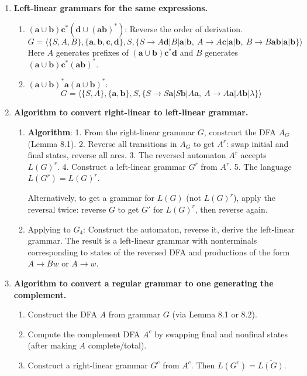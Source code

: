 \begin{enumerate}[{8.}1. ]
\item \textbf{Left-linear grammars for the same expressions.}

\begin{enumerate}
\item $(\pmb{a}\cup\pmb{b})\pmb{c}^*(\pmb{d}\cup(\pmb{ab})^*)$: Reverse the order of derivation.
\[
G = \langle\{S,A,B\},\{\pmb{a},\pmb{b},\pmb{c},\pmb{d}\},S,
\{S\to A\pmb{d}|B|\pmb{a}|\pmb{b},\ A\to A\pmb{c}|\pmb{a}|\pmb{b},\ B\to B\pmb{ab}|\pmb{a}|\pmb{b}\}\rangle
\]
Here $A$ generates prefixes of $(\pmb{a}\cup\pmb{b})\pmb{c}^*\pmb{d}$ and $B$ generates $(\pmb{a}\cup\pmb{b})\pmb{c}^*(\pmb{ab})^*$.

\item $(\pmb{a}\cup\pmb{b})^*\pmb{a}(\pmb{a}\cup\pmb{b})^*$:
\[
G = \langle\{S,A\},\{\pmb{a},\pmb{b}\},S,\{S\to S\pmb{a}|S\pmb{b}|A\pmb{a},\ A\to A\pmb{a}|A\pmb{b}|\lambda\}\rangle
\]
\end{enumerate}

\item \textbf{Algorithm to convert right-linear to left-linear grammar.}

\begin{enumerate}
\item \textbf{Algorithm}:
  1. From the right-linear grammar $G$, construct the DFA $A_G$ (Lemma 8.1).
  2. Reverse all transitions in $A_G$ to get $A^r$: swap initial and final states, reverse all arcs.
  3. The reversed automaton $A^r$ accepts $L(G)^r$.
  4. Construct a left-linear grammar $G^r$ from $A^r$.
  5. The language $L(G^r) = L(G)^r$.

  Alternatively, to get a grammar for $L(G)$ (not $L(G)^r$), apply the reversal twice: reverse $G$ to get $G'$ for $L(G)^r$, then reverse again.

\item Applying to $G_4$: Construct the automaton, reverse it, derive the left-linear grammar. The result is a left-linear grammar with nonterminals corresponding to states of the reversed DFA and productions of the form $A \to Bw$ or $A \to w$.
\end{enumerate}

\item \textbf{Algorithm to convert a regular grammar to one generating the complement.}

\begin{enumerate}
\item Construct the DFA $A$ from grammar $G$ (via Lemma 8.1 or 8.2).
\item Compute the complement DFA $A^c$ by swapping final and nonfinal states (after making $A$ complete/total).
\item Construct a right-linear grammar $G^c$ from $A^c$.
Then $L(G^c) = \overline{L(G)}$.
\end{enumerate}


\end{enumerate}
